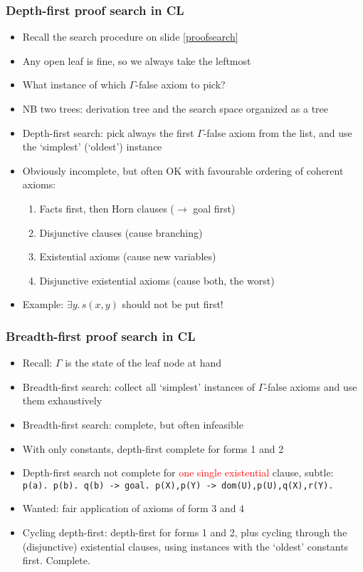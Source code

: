 \documentclass[handout,11pt]{beamer}
\newcommand{\red}[1]{\textcolor{red}{#1}}
\begin{document}
\begin{frame}
\frametitle{Depth-first proof search in CL}
 \begin{itemize}[<+->]   %
    \item Recall the search procedure on slide \ref{proofsearch}
    \item Any open leaf is fine, so we always take the leftmost
    \item What instance of which $\Gamma$-false axiom to pick?
    \item NB two trees: derivation tree and the search space
    organized as a tree
    \item Depth-first search: pick always the first $\Gamma$-false 
    axiom from the list, and use the `simplest' (`oldest') instance
    \item Obviously incomplete, but often OK with
    favourable ordering of coherent axioms:
    \begin{enumerate}
       \item Facts first, then Horn clauses ($\to$ goal first)
       \item Disjunctive clauses (cause branching)
       \item Existential axioms (cause new variables)
       \item Disjunctive existential axioms (cause both, the worst)
    \end{enumerate}
    \item Example: $\exists y.\,s(x,y)$ should not be put first!
 \end{itemize}
\end{frame}

\begin{frame}
\frametitle{Breadth-first proof search in CL}
 \begin{itemize}[<+->]   %
  \item Recall: $\Gamma$ is the state of the leaf node at hand 
  \item Breadth-first search: collect all `simplest' instances  
  of $\Gamma$-false axioms and use them exhaustively
  \item Breadth-first search: complete, but often infeasible
  \item With only constants, depth-first complete for forms 1 and 2
  \item Depth-first search not complete for \red{one single existential} clause, subtle:
\texttt{  p(a). p(b). q(b) -> goal. p(X),p(Y) -> dom(U),p(U),q(X),r(Y).}
    \item Wanted: fair application of axioms of form 3 and 4 
    \item Cycling depth-first: depth-first for forms 1 and 2, plus cycling
    through the (disjunctive) existential clauses, using instances
    with the `oldest' constants first. Complete.
 \end{itemize}
\end{frame}
\end{document}
